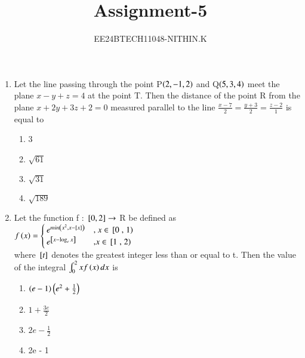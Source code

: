 \documentclass[journal]{IEEEtran}
\numberwithin{equation}{enumi}
\numberwithin{figure}{enumi}
\begin{document}


\title{Assignment-5}
\author{EE24BTECH11048-NITHIN.K}
{\let\newpage\relax\maketitle}

\begin{enumerate}
\section{SECTION-A}
\item Let the line passing through the point P$\left(2,-1,2\right)$ and Q$\left(5,3,4\right)$ meet the plane $x-y+z=4$ at the point T. Then the distance of the point R from the plane $x+2y+3z+2=0$ measured parallel
to the line $\frac{x-7}{2} = \frac{y+3}{2} = \frac{z-2}{1}$ is equal to
\begin{enumerate}
\item 3
\item $\sqrt{61}$
\item $\sqrt{31}$
\item $\sqrt{189}$
\end{enumerate}

\item Let the function f : ${}\left[0,2\right] \rightarrow$ R be defined as \\
	$f\left(x\right) = \begin{cases} e^{min\left(x^2,x-{}\left[x\right]\right)} & \text{, } x \in {}\left[0\right.,\left.1\right) \\ e^{{}\left[x-\log_e{x}\right]} & \text{,} x \in {}\left[1\right.,\left.2\right) \end{cases}$ \\
		where ${}\left[t\right]$ denotes the greatest integer less than or equal to t. Then the value of the integral $\int_{0}^{2}xf\left(x\right)dx$ is
\begin{enumerate}
\item $\left(e-1\right)\left(e^2+\frac{1}{2}\right)$
\item $1+\frac{3e}{2}$
\item $2e-\frac{1}{2}$
\item 2e - 1
\end{enumerate}


\end{enumerate}
\end{document}
